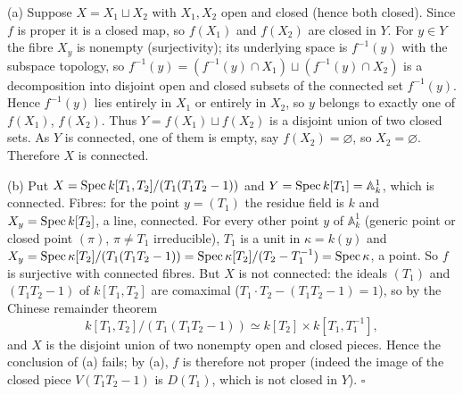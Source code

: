 \documentclass[11pt]{article}
\begin{document}
\pf
(a) Suppose $X=X_1\sqcup X_2$ with $X_1,X_2$ open and closed (hence both closed). Since $f$ is proper it is a closed map, so $f(X_1)$ and $f(X_2)$ are closed in $Y$. For $y\in Y$ the fibre $X_y$ is nonempty (surjectivity); its underlying space is $f^{-1}(y)$ with the subspace topology, so $f^{-1}(y)=(f^{-1}(y)\cap X_1)\sqcup(f^{-1}(y)\cap X_2)$ is a decomposition into disjoint open and closed subsets of the connected set $f^{-1}(y)$. Hence $f^{-1}(y)$ lies entirely in $X_1$ or entirely in $X_2$, so $y$ belongs to exactly one of $f(X_1)$, $f(X_2)$. Thus $Y=f(X_1)\sqcup f(X_2)$ is a disjoint union of two closed sets. As $Y$ is connected, one of them is empty, say $f(X_2)=\varnothing$, so $X_2=\varnothing$. Therefore $X$ is connected.

(b) Put $X=\operatorname{Spec} k[T_1,T_2]/(T_1(T_1T_2-1))$ and $Y=\operatorname{Spec} k[T_1]=\mathbb A^1_k$, which is connected. Fibres: for the point $y=(T_1)$ the residue field is $k$ and $X_y=\operatorname{Spec} k[T_2]$, a line, connected. For every other point $y$ of $\mathbb A^1_k$ (generic point or closed point $(\pi)$, $\pi\ne T_1$ irreducible), $T_1$ is a unit in $\kappa=k(y)$ and $X_y=\operatorname{Spec}\kappa[T_2]/(T_1(T_1T_2-1))=\operatorname{Spec}\kappa[T_2]/(T_2-T_1^{-1})=\operatorname{Spec}\kappa$, a point. So $f$ is surjective with connected fibres. But $X$ is not connected: the ideals $(T_1)$ and $(T_1T_2-1)$ of $k[T_1,T_2]$ are comaximal ($T_1\cdot T_2-(T_1T_2-1)=1$), so by the Chinese remainder theorem
\[ k[T_1,T_2]/(T_1(T_1T_2-1))\simeq k[T_2]\times k[T_1,T_1^{-1}], \]
and $X$ is the disjoint union of two nonempty open and closed pieces. Hence the conclusion of (a) fails; by (a), $f$ is therefore not proper (indeed the image of the closed piece $V(T_1T_2-1)$ is $D(T_1)$, which is not closed in $Y$). \hfill$\square$
\end{document}
